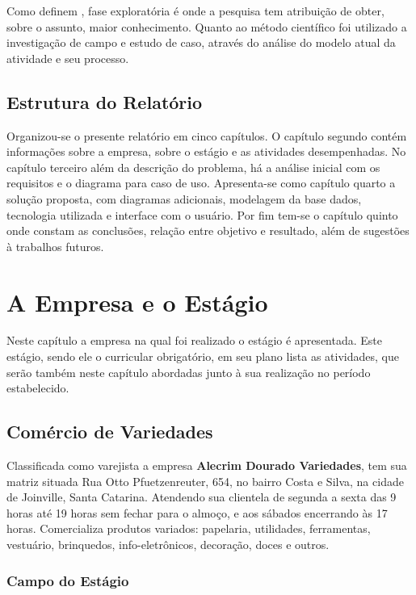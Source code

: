 \documentclass[
	draft,
	12pt,
	openright,
	oneside, %
	a4paper,
	chapter=TITLE,
	section=TITLE,
	english,
	brazil %
	]{abntex2-udesc}
\begin{document}
Como definem , fase exploratória é onde a pesquisa tem atribuição de obter, sobre o assunto, maior conhecimento. Quanto ao método científico foi utilizado a investigação de campo e estudo de caso, através do análise do modelo atual da atividade e seu processo.

\section{Estrutura do Relatório}

Organizou-se o presente relatório em cinco capítulos. O capítulo segundo contém informações sobre a empresa, sobre o estágio e as atividades desempenhadas. No capítulo terceiro além da descrição do problema, há a análise inicial com os requisitos e o diagrama para caso de uso. Apresenta-se como capítulo quarto a solução proposta, com diagramas adicionais, modelagem da base dados, tecnologia utilizada e interface com o usuário. Por fim tem-se o capítulo quinto onde constam as conclusões, relação entre objetivo e resultado, além de sugestões à trabalhos futuros.

\chapter{A Empresa e o Estágio}

Neste capítulo a empresa na qual foi realizado o estágio é apresentada. Este estágio, sendo ele o curricular obrigatório, em seu plano lista as atividades, que serão também neste capítulo abordadas junto à sua realização no período estabelecido.

\section{Comércio de Variedades}

Classificada como varejista a empresa \textbf{Alecrim Dourado Variedades}, tem sua matriz situada Rua Otto Pfuetzenreuter, 654, no bairro Costa e Silva, na cidade de Joinville, Santa Catarina. Atendendo sua clientela de segunda a sexta das 9 horas até 19 horas sem fechar para o almoço, e aos sábados encerrando às 17 horas. Comercializa produtos variados: papelaria, utilidades, ferramentas, vestuário, brinquedos, info-eletrônicos, decoração, doces e outros.

\subsection{Campo do Estágio}
\end{document}
